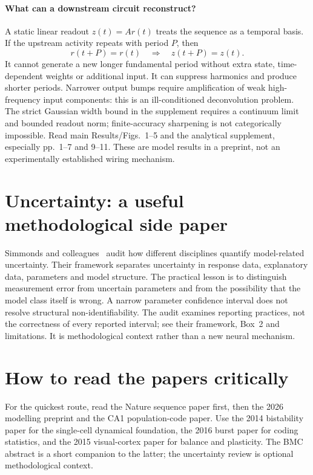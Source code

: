 \documentclass[11pt,a4paper]{article}
\begin{document}
\paragraph{What can a downstream circuit reconstruct?}
A static linear readout $z(t)=Ar(t)$ treats the sequence as a temporal basis. If the upstream activity repeats with period $P$, then
\[r(t+P)=r(t)\quad\Longrightarrow\quad z(t+P)=z(t).\]
It cannot generate a new longer fundamental period without extra state, time-dependent weights or additional input. It can suppress harmonics and produce shorter periods. Narrower output bumps require amplification of weak high-frequency input components: this is an ill-conditioned deconvolution problem. The strict Gaussian width bound in the supplement requires a continuum limit and bounded readout norm; finite-accuracy sharpening is not categorically impossible. Read main Results/Figs.~1--5 and the analytical supplement, especially pp.~1--7 and 9--11. These are model results in a preprint, not an experimentally established wiring mechanism.

\section{Uncertainty: a useful methodological side paper}
Simmonds and colleagues~\cite{uncertainty} audit how different disciplines quantify model-related uncertainty. Their framework separates uncertainty in response data, explanatory data, parameters and model structure. The practical lesson is to distinguish measurement error from uncertain parameters and from the possibility that the model class itself is wrong. A narrow parameter confidence interval does not resolve structural non-identifiability. The audit examines reporting practices, not the correctness of every reported interval; see their framework, Box~2 and limitations. It is methodological context rather than a new neural mechanism.

\section{How to read the papers critically}
For the quickest route, read the Nature sequence paper first, then the 2026 modelling preprint and the CA1 population-code paper. Use the 2014 bistability paper for the single-cell dynamical foundation, the 2016 burst paper for coding statistics, and the 2015 visual-cortex paper for balance and plasticity. The BMC abstract is a short companion to the latter; the uncertainty review is optional methodological context.
\end{document}
